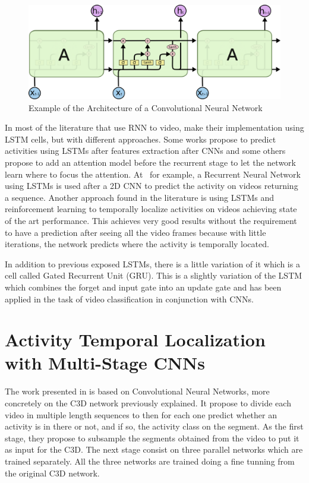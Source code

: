 \begin{figure}[ht]
\begin{center}
\includegraphics[width=0.8\linewidth]{img/stateofart/lstm_chain}
\end{center}
\caption{Example of the Architecture of a Convolutional Neural Network}
\label{fig:lstm_chain}
\end{figure}

In most of the literature that use RNN to video, make their implementation using LSTM cells, but with different approaches. Some works propose to predict activities using LSTMs after features extraction after CNNs\cite{yao2015describing} and some others propose to add an attention model before the recurrent stage to let the network learn where to focus the attention\cite{sharma2015action}\cite{piergiovanni2016temporal}. At~\cite{yeung2015every} for example, a Recurrent Neural Network using LSTMs is used after a 2D CNN to predict the activity on videos returning a sequence. Another approach found in the literature is using LSTMs and reinforcement learning to temporally localize activities on videos\cite{yeung2015end} achieving state of the art performance. This achieves very good results without the requirement to have a prediction after seeing all the video frames because with little iterations, the network predicts where the activity is temporally located.

In addition to previous exposed LSTMs, there is a little variation of it which is a cell called Gated Recurrent Unit (GRU)\cite{cho2014learning}. This is a slightly variation of the LSTM which combines the forget and input gate into an update gate and has been applied in the task of video classification\cite{ballas2015delving} in conjunction with CNNs.

\section{Activity Temporal Localization with Multi-Stage CNNs}

The work presented in \cite{shoutemporal} is based on Convolutional Neural Networks, more concretely on the C3D network previously explained. It propose to divide each video in multiple length sequences to then for each one predict whether an activity is in there or not, and if so, the activity class on the segment. As the first stage, they propose to subsample the segments obtained from the video to put it as input for the C3D. The next stage consist on three parallel networks which are trained separately. All the three networks are trained doing a fine tunning from the original C3D network\cite{tran2014learning}. 

